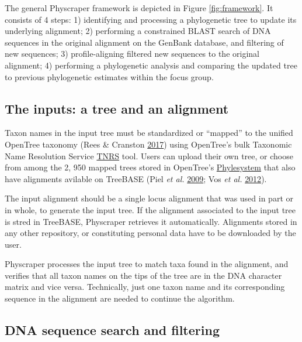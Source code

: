 \documentclass[]{article}
\begin{document}
The general Physcraper framework is depicted in Figure \ref{fig:framework}. It consists of 4 steps: 1) identifying and processing a phylogenetic tree to update its underlying alignment; 2) performing a constrained BLAST search of DNA sequences in the original alignment on the GenBank database, and filtering of new sequences; 3) profile-aligning filtered new sequences to the original alignment; 4) performing a phylogenetic analysis and comparing the updated tree to previous phylogenetic estimates within the focus group.

\hypertarget{the-inputs-a-tree-and-an-alignment}{%
\subsection{The inputs: a tree and an alignment}\label{the-inputs-a-tree-and-an-alignment}}

Taxon names in the input tree must be standardized or ``mapped'' to the unified OpenTree taxonomy (Rees \& Cranston \protect\hyperlink{ref-rees2017automated}{2017}) using OpenTree's bulk Taxonomic Name Resolution Service \href{https://tree.opentreeoflife.org/curator/tnrs/}{TNRS} tool. Users can upload their own tree, or choose from among the 2, 950 mapped trees stored in OpenTree's \href{https://github.com/opentreeoflife/phylesystem}{Phylesystem} that also have alignments avilable on TreeBASE (Piel \emph{et al.} \protect\hyperlink{ref-piel2009treebase}{2009}; Vos \emph{et al.} \protect\hyperlink{ref-vos2012nexml}{2012}).

The input alignment should be a single locus alignment that was used in part or in whole, to generate the input tree. If the alignment associated to the input tree is stred in TreeBASE, Physcraper retrieves it automatically. Alignments stored in any other repository, or constituting personal data have to be downloaded by the user.

Physcraper processes the input tree to match taxa found in the alignment, and verifies that all taxon names on the tips of the tree are in the DNA character matrix and vice versa. Technically, just one taxon name and its corresponding sequence in the alignment are needed to continue the algorithm.

\hypertarget{dna-sequence-search-and-filtering}{%
\subsection{DNA sequence search and filtering}\label{dna-sequence-search-and-filtering}}
\end{document}
